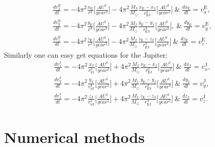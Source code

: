 \documentclass[10pt]{article}
\begin{document}
\begin{equation}\label{eq:motion-3-earth}
\begin{aligned}
\frac{dv_x^{\mathrm{E}}}{dt}=-4\pi^2\frac{x_{\mathrm{E}}}{r^3} \Bigg[ \frac{AU^3}{year^2}\Bigg] - 4\pi^2\frac{M_{\mathrm{J}}}{M_{\odot}}\frac{x_{\mathrm{E}}-x_{\mathrm{J}}}{r_{\mathrm{EJ}}^3} \Bigg[ \frac{AU^3}{year^2}\Bigg]\ \& \ \frac{dx_{\mathrm{E}}}{dt} = v_x^{\mathrm{E}},\\
\frac{dv_y^{\mathrm{E}}}{dt}=-4\pi^2\frac{y_{\mathrm{E}}}{r^3} \Bigg[ \frac{AU^3}{year^2}\Bigg] - 4\pi^2\frac{M_{\mathrm{J}}}{M_{\odot}}\frac{y_{\mathrm{E}}-y_{\mathrm{J}}}{r_{\mathrm{EJ}}^3} \Bigg[ \frac{AU^3}{year^2}\Bigg],\ \& \ \frac{dy_{\mathrm{E}}}{dt} = v_y^{\mathrm{E}},\\
\frac{dv_z^{\mathrm{E}}}{dt}=-4\pi^2\frac{z_{\mathrm{E}}}{r^3} \Bigg[ \frac{AU^3}{year^2}\Bigg] -4\pi^2\frac{M_{\mathrm{J}}}{M_{\odot}}\frac{z_{\mathrm{E}}-z_{\mathrm{J}}}{r_{\mathrm{EJ}}^3} \Bigg[ \frac{AU^3}{year^2}\Bigg]\ \& \ \frac{dz_{\mathrm{E}}}{dt} = v_z^{\mathrm{E}}.
\end{aligned}
\end{equation}  
Similarly one can easy get equations for the Jupiter:
\begin{equation}\label{eq:motion-3-jupiter}
\begin{aligned}
\frac{dv_x^{\mathrm{J}}}{dt}=-4\pi^2\frac{x_{\mathrm{J}}}{r_{\mathrm{SJ}}^3} \Bigg[ \frac{AU^3}{year^2}\Bigg] + 4\pi^2\frac{M_{\mathrm{J}}}{M_{\odot}}\frac{x_{\mathrm{E}}-x_{\mathrm{J}}}{r_{\mathrm{EJ}}^3} \Bigg[ \frac{AU^3}{year^2}\Bigg]\ \& \ \frac{dx_{\mathrm{J}}}{dt} = v_x^{\mathrm{J}},\\
\frac{dv_y^{\mathrm{J}}}{dt}=-4\pi^2\frac{y_{\mathrm{J}}}{r_{\mathrm{SJ}}^3} \Bigg[ \frac{AU^3}{year^2}\Bigg] + 4\pi^2\frac{M_{\mathrm{J}}}{M_{\odot}}\frac{y_{\mathrm{E}}-y_{\mathrm{J}}}{r_{\mathrm{EJ}}^3} \Bigg[ \frac{AU^3}{year^2}\Bigg]\ \& \ \frac{dy_{\mathrm{J}}}{dt} = v_y^{\mathrm{J}}, \\
\frac{dv_z^{\mathrm{J}}}{dt}=-4\pi^2\frac{z_{\mathrm{J}}}{r_{\mathrm{SJ}}^3} \Bigg[ \frac{AU^3}{year^2}\Bigg] + 4\pi^2\frac{M_{\mathrm{J}}}{M_{\odot}}\frac{z_{\mathrm{E}}-z_{\mathrm{J}}}{r_{\mathrm{EJ}}^3} \Bigg[ \frac{AU^3}{year^2}\Bigg]\ \& \ \frac{dz_{\mathrm{J}}}{dt} = v_z^{\mathrm{J}}.
\end{aligned}
\end{equation}  

\section{Numerical methods}\label{Numerical methods}
\end{document}
